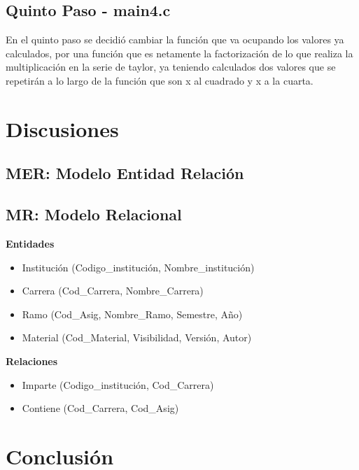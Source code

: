 \documentclass[12pt,letterpaper]{article}
\begin{document}
\subsection{Quinto Paso - main4.c}
En el quinto paso se decidió cambiar la función que va ocupando los valores ya calculados, por una función que es netamente la factorización de lo que realiza la multiplicación en la serie de taylor, ya teniendo calculados dos valores que se repetirán a lo largo de la función que son x al cuadrado y x a la cuarta.
\newpage
\section{Discusiones}
\subsection{MER: Modelo Entidad Relación}

\subsection{MR: Modelo Relacional}
\textbf{Entidades}

\begin{itemize}
\item Institución (Codigo\_institución, Nombre\_institución)
\item Carrera (Cod\_Carrera, Nombre\_Carrera)
\item Ramo (Cod\_Asig, Nombre\_Ramo, Semestre, Año)
\item Material (Cod\_Material, Visibilidad, Versión, Autor)
\end{itemize}

\textbf{Relaciones}
\begin{itemize}
\item Imparte (Codigo\_institución, Cod\_Carrera)
\item Contiene (Cod\_Carrera, Cod\_Asig)
\end{itemize}

\newpage
\section{Conclusión}
\lipsum[1-3]

\newpage
{}


\end{document}
